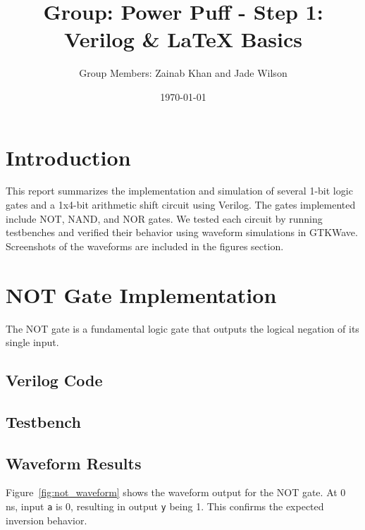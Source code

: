 \documentclass[12pt]{report}
\title{Group: Power Puff - Step 1: Verilog \& LaTeX Basics}
\author{Group Members: Zainab Khan and Jade Wilson}
\date{\today}
\begin{document}
\maketitle
\tableofcontents
\newpage

\chapter{Introduction}

This report summarizes the implementation and simulation of several 1-bit logic gates and a 1x4-bit arithmetic shift circuit using Verilog. The gates implemented include NOT, NAND, and NOR gates. We tested each circuit by running testbenches and verified their behavior using waveform simulations in GTKWave. Screenshots of the waveforms are included in the figures section.

\chapter{NOT Gate Implementation}

The NOT gate is a fundamental logic gate that outputs the logical negation of its single input.

\section{Verilog Code}



\section{Testbench}



\section{Waveform Results}

Figure~\ref{fig:not_waveform} shows the waveform output for the NOT gate. At 0 ns, input \texttt{a} is 0, resulting in output \texttt{y} being 1. This confirms the expected inversion behavior.
\end{document}
